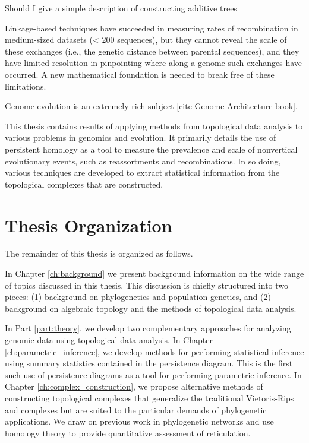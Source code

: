 Should I give a simple description of constructing additive trees

Linkage-based techniques have succeeded in measuring rates of recombination in medium-sized datasets (< 200 sequences), but they cannot reveal the scale of these exchanges (i.e., the genetic distance between parental sequences), and they have limited resolution in pinpointing where along a genome such exchanges have occurred.
A new mathematical foundation is needed to break free of these limitations.

Genome evolution is an extremely rich subject [cite Genome Architecture book].

This thesis contains results of applying methods from topological data analysis to various problems in genomics and evolution.
It primarily details the use of persistent homology as a tool to measure the prevalence and scale of nonvertical evolutionary events, such as reassortments and recombinations.
In so doing, various techniques are developed to extract statistical information from the topological complexes that are constructed.

\section{Thesis Organization}

The remainder of this thesis is organized as follows.

In Chapter \ref{ch:background} we present background information on the wide range of topics discussed in this thesis.
This discussion is chiefly structured into two pieces: (1) background on phylogenetics and population genetics, and (2) background on algebraic topology and the methods of topological data analysis.

In Part \ref{part:theory}, we develop two complementary approaches for analyzing genomic data using topological data analysis.
In Chapter \ref{ch:parametric_inference}, we develop methods for performing statistical inference using summary statistics contained in the persistence diagram.
This is the first such use of persistence diagrams as a tool for performing parametric inference.
In Chapter \ref{ch:complex_construction}, we propose alternative methods of constructing topological complexes that generalize the traditional Vietoris-Rips and \Cech complexes but are suited to the particular demands of phylogenetic applications.
We draw on previous work in phylogenetic networks and use homology theory to provide quantitative assessment of reticulation.

